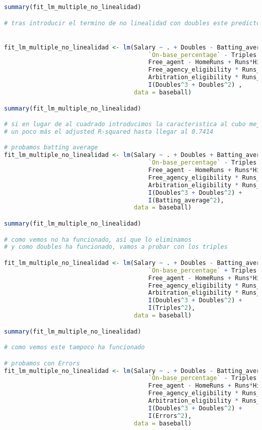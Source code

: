 \begin{lstlisting}[language=R]
summary(fit_lm_multiple_no_linealidad)

# tras introducir el termino de no linealidad con doubles este predictor si ha pasado a tener importancia


fit_lm_multiple_no_linealidad <- lm(Salary ~ . + Doubles - Batting_average - Walks -
										`On-base_percentage` - Triples - Arbitration - Errors -
										Free_agent - HomeRuns + Runs*Hits +
										Free_agency_eligibility * Runs_batted_in +
										Arbitration_eligibility * Runs_batted_in +
										I(Doubles^3 + Doubles^2) ,
									data = baseball)

summary(fit_lm_multiple_no_linealidad)

# si en lugar de al cuadrado introducimos la caracteristica al cubo mejoramos
# un poco más el adjusted R-squared hasta llegar al 0.7414

# probamos batting average
fit_lm_multiple_no_linealidad <- lm(Salary ~ . + Doubles + Batting_average - Walks -
										`On-base_percentage` - Triples - Arbitration - Errors -
										Free_agent - HomeRuns + Runs*Hits +
										Free_agency_eligibility * Runs_batted_in +
										Arbitration_eligibility * Runs_batted_in +
										I(Doubles^3 + Doubles^2) +
										I(Batting_average^2),
									data = baseball)

summary(fit_lm_multiple_no_linealidad)

# como vemos no ha funcionado, así que lo eliminamos
# y como doubles ha funcionado, vamos a probar con los triples

fit_lm_multiple_no_linealidad <- lm(Salary ~ . + Doubles - Batting_average - Walks -
										`On-base_percentage` + Triples - Arbitration - Errors -
										Free_agent - HomeRuns + Runs*Hits +
										Free_agency_eligibility * Runs_batted_in +
										Arbitration_eligibility * Runs_batted_in +
										I(Doubles^3 + Doubles^2) +
										I(Triples^2),
									data = baseball)

summary(fit_lm_multiple_no_linealidad)

# como vemos este tampoco ha funcionado

# probamos con Errors
fit_lm_multiple_no_linealidad <- lm(Salary ~ . + Doubles - Batting_average - Walks -
										`On-base_percentage` - Triples - Arbitration + Errors -
										Free_agent - HomeRuns + Runs*Hits +
										Free_agency_eligibility * Runs_batted_in +
										Arbitration_eligibility * Runs_batted_in +
										I(Doubles^3 + Doubles^2) +
										I(Errors^2),
									data = baseball)


\end{lstlisting}
